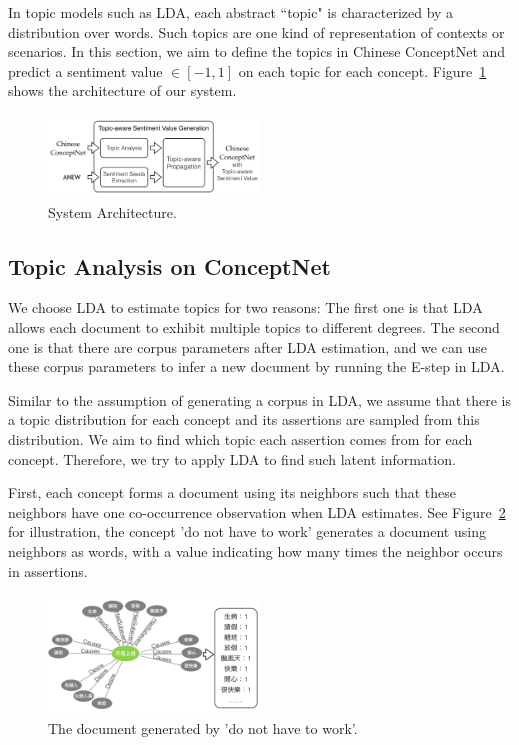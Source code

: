In topic models such as LDA, each abstract ``topic" is characterized by a distribution over words. Such topics are one kind of representation of contexts or scenarios. In this section, we aim to define the topics in Chinese ConceptNet and predict a sentiment value $\in [-1,1]$ on each topic for each concept. Figure~\ref{fig:system1} shows the architecture of our system.

\begin{figure}[!t]
\centering
\includegraphics[width=0.5\textwidth]{fig/system1.png}
\caption{System Architecture.}
\label{fig:system1}
\end{figure}

\subsection{Topic Analysis on ConceptNet}
We choose LDA to estimate topics for two reasons: The first one is that LDA allows each document to exhibit multiple topics to different degrees. The second one is that there are corpus parameters after LDA estimation, and we can use these corpus parameters to infer a new document by running the E-step in LDA. 

Similar to the assumption of generating a corpus in LDA, we assume that there is a topic distribution for each concept and its assertions are sampled from this distribution. We aim to find which topic each assertion comes from for each concept. Therefore, we try to apply LDA to find such latent information. 

First, each concept forms a document using its neighbors such that these neighbors have one co-occurrence observation when LDA estimates. See Figure~\ref{fig:noWorkDoc} for illustration, the concept 'do not have to work' generates a document using neighbors as words, with a value indicating how many times the neighbor occurs in assertions.

\begin{figure}[!t]
\centering
\includegraphics[width=0.5\textwidth]{fig/noWorkDoc.png}
\caption{The document generated by 'do not have to work'.}
\label{fig:noWorkDoc}
\end{figure}

